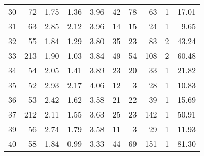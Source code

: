 \begin{tabular}{rrrrrrrrrr}
30 &       72 &                             1.75 &                             1.36 &                             3.96 &              42 &              78 &                        63 &          1 &                        17.01 \\
31 &       63 &                             2.85 &                             2.12 &                             3.96 &              14 &              15 &                        24 &          1 &                         9.65 \\
32 &       55 &                             1.84 &                             1.29 &                             3.80 &              35 &              23 &                        83 &          2 &                        43.24 \\
33 &      213 &                             1.90 &                             1.03 &                             3.84 &              49 &              54 &                       108 &          2 &                        60.48 \\
34 &       54 &                             2.05 &                             1.41 &                             3.89 &              23 &              20 &                        33 &          1 &                        21.82 \\
35 &       52 &                             2.93 &                             2.17 &                             4.06 &              12 &               3 &                        28 &          1 &                        10.83 \\
36 &       53 &                             2.42 &                             1.62 &                             3.58 &              21 &              22 &                        39 &          1 &                        15.69 \\
37 &      212 &                             2.11 &                             1.55 &                             3.63 &              25 &              23 &                       142 &          1 &                        50.91 \\
39 &       56 &                             2.74 &                             1.79 &                             3.58 &              11 &               3 &                        29 &          1 &                        11.93 \\
40 &       58 &                             1.84 &                             0.99 &                             3.33 &              44 &              69 &                       151 &          1 &                        81.30 \\

\end{tabular}

